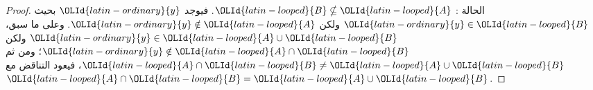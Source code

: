 \documentclass[../../../include/open-logic-section]{subfiles}
\begin{document}
\begin{proof}
  الحالة : $\OLId{latin-looped}{B} \nsubseteq \OLId{latin-looped}{A}$. فيوجد $\OLId{latin-ordinary}{y}$ بحيث $\OLId{latin-ordinary}{y} \in \OLId{latin-looped}{B}$ ولكن
  $\OLId{latin-ordinary}{y} \notin \OLId{latin-looped}{A}$. وعلى ما سبق، $\OLId{latin-ordinary}{y} \in \OLId{latin-looped}{A} \cup \OLId{latin-looped}{B}$ ولكن
  $\OLId{latin-ordinary}{y} \notin \OLId{latin-looped}{A} \cap \OLId{latin-looped}{B}$؛ ومن ثم $\OLId{latin-looped}{A} \cap \OLId{latin-looped}{B} \neq \OLId{latin-looped}{A} \cup \OLId{latin-looped}{B}$، فيعود
  التناقض مع $\OLId{latin-looped}{A} \cap \OLId{latin-looped}{B} = \OLId{latin-looped}{A} \cup \OLId{latin-looped}{B}$.
\end{proof}
\end{document}
